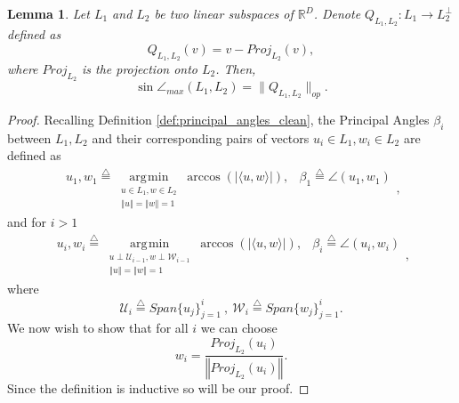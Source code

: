 \documentclass[12pt]{article}
\newtheorem{Lemma}[Theorem]{Lemma}
\theoremstyle{remark}
\newcommand{\RR}{\mathbb{R}}
\newcommand{\UU}{\mathcal{U}}
\newcommand{\WW}{\mathcal{W}}
\newcommand{\defeq}{\stackrel{\bigtriangleup}{=}}
\newcommand{\abs}[1]{\left\vert #1 \right\vert}
\newcommand{\norm}[1]{\left\Vert #1 \right\Vert}
\DeclareMathOperator*{\argmin}{\arg\!\min}
\begin{document}
\begin{appendices}
\begin{Lemma}\label{lem:Q_angle_between_flats}
    Let $L_1$ and $L_2$ be two linear subspaces of $\RR^D$. Denote $Q_{L_1,L_2}:L_1 \rightarrow L_2^\perp$ defined as
    \[
    Q_{L_1,L_2}(v) = v - Proj_{L_2}(v)
    ,\]
    where $ Proj_{L_2} $ is the projection onto $ L_2 $.
    Then, 
    \[
    \sin \angle_{max}(L_1,L_2) = \|Q_{L_1,L_2}\|_{op}
    .\]
\end{Lemma}
\begin{proof}
	Recalling Definition \ref{def:principal_angles_clean}, the Principal Angles $ \beta_i $ between  $ L_1, L_2 $ and their corresponding pairs of vectors $ u_i\in L_1, w_i\in L_2 $ are defined as
	\begin{equation*}
	\begin{array}{ll}
	u_1, w_1 \defeq \argmin\limits_{\substack{u\in L_1, w\in L_2 \\ \norm{u}=\norm{w} =1}}\arccos\left(\abs{\langle u, w \rangle}\right), &
	\beta_1 \defeq \angle(u_1, w_1)
	\end{array}    
	,\end{equation*}
	and for $i > 1$
	\begin{equation*}
	\begin{array}{ll}
	u_i, w_i \defeq \argmin\limits_{\substack{u\perp\UU_{i-1}, w\perp\WW_{i-1} \\ \norm{u}=\norm{w} =1}}\arccos\left(\abs{\langle u, w \rangle}\right), &
	\beta_i \defeq \angle(u_i, w_i)
	\end{array}
	,\end{equation*}
	where $$\UU_i \defeq Span\{u_j\}_{j=1}^i ~,~ \WW_i \defeq Span\{w_j\}_{j=1}^i.$$
	We now wish to show that for all $ i $ we can choose
	\[
	w_i = \frac{Proj_{L_2}(u_i)}{\norm{Proj_{L_2}(u_i)}}
	.\]
	Since the definition is inductive so will be our proof.

\end{proof}
\end{appendices}
\end{document}
